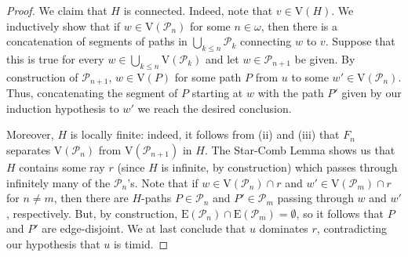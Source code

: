 \documentclass[10pt,a4paper]{amsart}
\begin{document}
\begin{proof}
    We claim that $H$ is connected. Indeed, note that $v\in \mathrm{V}(H)$. We inductively show that if $w\in \mathrm{V}(\mathcal P_n)$ for some $n\in\omega$, then there is a concatenation of segments of paths in $\bigcup_{k\le n}\mathcal{P}_k$ connecting $w$ to $v$. Suppose that this is true for every $w\in \bigcup_{k\le n} \mathrm{V}(\mathcal P_k)$ and let $w\in \mathcal P_{n+1}$ be given. By construction of $\mathcal{P}_{n+1}$, $w\in \mathrm{V}(P)$ for some path $P$ from $u$ to some $w'\in \mathrm{V}(\mathcal P_n)$. Thus, concatenating the segment of $P$ starting at $w$ with the path $P'$ given by our induction hypothesis to $w'$ we reach the desired conclusion. 
    
    Moreover, $H$ is locally finite: indeed, it follows from (ii) and (iii) that $F_n$ separates $\mathrm{V}(\mathcal P_n)$ from $\mathrm{V}(\mathcal P_{n+1})$ in $H$. The Star-Comb Lemma shows us that $H$ contains some ray $r$ (since $H$ is infinite, by construction) which passes through infinitely many of the $\mathcal P_n$'s. Note that if $w\in \mathrm{V}(\mathcal P_n)\cap r$ and $w'\in \mathrm{V}(\mathcal P_m)\cap r$ for $n\neq m$, then there are $H$-paths $P\in \mathcal P_n$ and $P'\in \mathcal P_m$ passing through $w$ and $w'$, respectively. But, by construction, $\mathrm{E}(\mathcal P_n)\cap \mathrm{E}(\mathcal P_m)=\emptyset$, so it follows that $P$ and $P'$ are edge-disjoint. We at last conclude that $u$ dominates $r$, contradicting our hypothesis that $u$ is timid. 
\end{proof}
\end{document}
